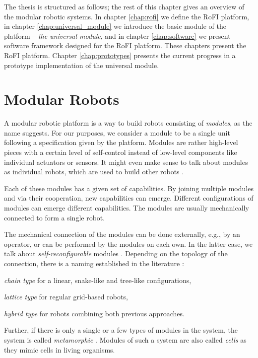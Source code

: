 The thesis is structured as follows; the rest of this chapter gives an overview
of the modular robotic systems. In chapter \ref{chap:rofi} we define the RoFI
platform, in chapter \ref{chap:universal_module} we introduce the basic module
of the platform -- \emph{the universal module}, and in chapter
\ref{chap:software} we present software framework designed for the RoFI
platform. These chapters present the RoFI platform. Chapter
\ref{chap:prototypes} presents the current progress in a prototype
implementation of the universal module.

\section{Modular Robots}

A modular robotic platform is a way to build robots consisting of
\emph{modules}, as the name suggests. For our purposes, we consider a module to
be a single unit following a specification given by the platform. Modules are
rather high-level pieces with a certain level of self-control instead of
low-level components like individual actuators or sensors. It might even make
sense to talk about modules as individual robots, which are used to build other
robots \cite{brunete_current_2017}.

Each of these modules has a given set of capabilities. By joining multiple
modules and via their cooperation, new capabilities can emerge. Different
configurations of modules can emerge different capabilities. The modules are
usually mechanically connected to form a single robot.

The mechanical connection of the modules can be done externally, e.g., by an
operator, or can be performed by the modules on each own. In the latter case, we
talk about \emph{self-reconfigurable} modules \cite{brunete_current_2017}.
Depending on the topology of the connection, there is a naming established in
the literature \cite{brunete_current_2017}:
\begin{enumerate*}
    \item \emph{chain type} for a linear, snake-like and tree-like
    configurations,
    \item \emph{lattice type} for regular grid-based robots,
    \item \emph{hybrid type} for robots combining both previous approaches.
\end{enumerate*}
Further, if there is only a single or a few types of modules in the system, the
system is called \emph{metamorphic} \cite{brunete_current_2017}. Modules of such
a system are also called \emph{cells} as they mimic cells in living organisms.


